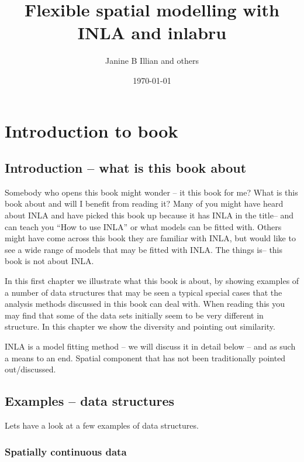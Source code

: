 \documentclass[authoryear]{book}
\title{Flexible spatial modelling with INLA and inlabru}
\author{Janine B Illian and others }
\date{\today}
\theoremstyle{definition}
\begin{document}
\maketitle

\chapter{Introduction to book}

\section{Introduction -- what is this book about}
Somebody who opens this book might wonder -- it this book for me? What is this book about and will I benefit from reading it?
 Many of you might have heard about INLA and have picked this book up because it has INLA in the title-- and can teach you ``How to use INLA'' or what models can be fitted with. Others might have come across this book they are familiar with INLA, but would like to see a wide  range of models that may be fitted with INLA. The things is-- this book is not about INLA.
 
In this first chapter we illustrate what this book  is about, by showing examples of a number of data structures that may be seen a typical special cases that the analysis methods discussed in this book can deal with. When reading this you may find that some of the data sets initially seem to be very different in structure. In this chapter we show the diversity and pointing out similarity.

INLA is a model fitting method -- we will discuss it in detail below -- and as such a means to an end. 
Spatial component that has not been traditionally pointed out/discussed.


\section{Examples -- data structures}

Lets have a look at a few examples of data structures.

\subsection{Spatially continuous data}
\end{document}
